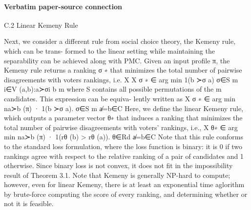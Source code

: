 \documentclass[10pt]{article}
\begin{document}
\paragraph{Verbatim paper-source connection}
\begin{ReviewVerbatim}
C.2   Linear Kemeny Rule

Next, we consider a different rule from social choice theory, the Kemeny rule, which can be trans-
formed to the linear setting while maintaining the separability can be achieved along with PMC.
Given an input profile π, the Kemeny rule returns a ranking σ ∗ that minimizes the total number of
pairwise disagreements with voters rankings, i.e.
                                            X X
                              σ ∗ ∈ arg min                1(b ≻σ a)
                                        σ∈S m
                                                 i∈V (a,b):a≻σi b
        m
where S contains all possible permutations of the m candidates. This expression can be equiva-
lently written as                        X
                          σ ∗ ∈ arg min        na≻b (π) · 1(b ≻σ a).
                                      σ∈S m
                                                a̸=b∈C
Here, we define the linear Kemeny rule, which outputs a parameter vector θ∗ that induces a ranking
that minimizes the total number of pairwise disagreements with voters’ rankings, i.e.,
                                        X
                          θ∗ ∈ arg min       na≻b (π) · 1(rθ (b) > rθ (a)).
                                 θ∈Rd    a̸=b∈C
Note that this rule conforms to the standard loss formulation, where the loss function is binary: it is
0 if two rankings agree with respect to the relative ranking of a pair of candidates and 1 otherwise.
Since binary loss is not convex, it does not fit in the impossibility result of Theorem 3.1.
Note that Kemeny is generally NP-hard to compute; however, even for linear Kemeny, there is
at least an exponential time aglorithm by brute-force computing the score of every ranking, and
determining whether or not it is feasible.
\end{ReviewVerbatim}
\end{document}
